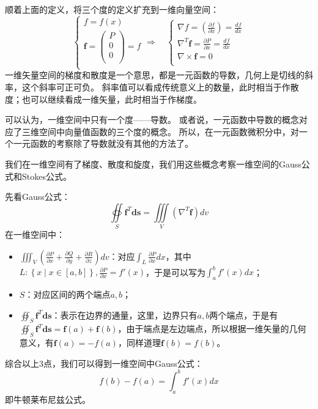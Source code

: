 顺着上面的定义，将三个度的定义扩充到一维向量空间：
\[
\begin{cases}
	f=f\left( x \right)\\
	\boldsymbol{f}=\left( \begin{array}{c}
	P\\
	0\\
	0\\
\end{array} \right) =f\\
\end{cases} \Rightarrow \quad \begin{cases}
	\nabla f=\left( \frac{\partial f}{\partial x} \right) =\frac{df}{dx}\\
	\nabla ^T\boldsymbol{f}=\frac{\partial P}{\partial x}=\frac{df}{dx}\\
	\nabla \times \boldsymbol{f}=0\\
\end{cases}
\]
一维矢量空间的梯度和散度是一个意思，都是一元函数的导数，几何上是切线的斜率，这个斜率可正可负。
斜率值可以看成传统意义上的数量，此时相当于作散度；也可以继续看成一维矢量，此时相当于作梯度。

\begin{tcolorbox}
可以认为，一维空间中只有一个度——导数。
或者说，一元函数中导数的概念对应了三维空间中向量值函数的三个度的概念。
所以，在一元函数微积分中，对一个一元函数的考察除了导数就没有其他的方法了。
\end{tcolorbox}

我们在一维空间有了梯度、散度和旋度，我们用这些概念考察一维空间的Gauss公式和Stokes公式。

先看Gauss公式：
\[
\oiint\limits_S{\boldsymbol{f}^T\boldsymbol{ds}}=\iiint\limits_V{\left( \nabla ^T\boldsymbol{f} \right) dv}
\]
在一维空间中：
\begin{itemize}
    \item $\iiint_V{\left( \frac{\partial P}{\partial x}+\frac{\partial Q}{\partial y}+\frac{\partial R}{\partial z} \right) dv}$：对应$\int_L{\frac{\partial P}{\partial x}dx}$，其中$L:\left\{ x \middle| x\in \left[ a,b \right] \right\} ,\frac{\partial P}{\partial x}=f'\left( x \right) $，于是可以写为$\int_a^b{f'\left( x \right) dx}$；
    \item $S$：对应区间的两个端点$a,b$；
    \item $\oiint_S{\boldsymbol{f}^T\boldsymbol{ds}}$：表示在边界的通量，这里，边界只有$a,b$两个端点，于是有$\oiint_S{\boldsymbol{f}^T\boldsymbol{ds}}=\boldsymbol{f}\left( a \right) +\boldsymbol{f}\left( b \right) $，由于端点是左边端点，所以根据一维矢量的几何意义，有$\boldsymbol{f}\left( a \right) =-f\left( a \right) $，同样道理$\boldsymbol{f}\left( b \right) =f\left( b \right) $。
\end{itemize}
综合以上3点，我们可以得到一维空间中Gauss公式：
\[
f\left( b \right) -f\left( a \right) =\int_a^b{f'\left( x \right) dx}
\]
即牛顿莱布尼兹公式。

